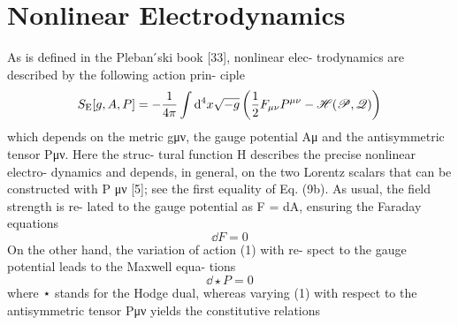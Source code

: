 \section{Nonlinear Electrodynamics}
As is defined in the Pleban ́ski book [33], nonlinear elec- trodynamics are described by the following action prin- ciple
\begin{equation}
  S_{\rm E}[g,A,P]=-\frac{1}{4\pi }\int\dd^4 x\sqrt{-g}\left(\frac{1}{2}F_{\mu\nu }P^{\mu\nu }-\mathscr{H}(\mathscr{P},\mathscr{Q})\right)
\end{equation}
which depends on the metric gμν, the gauge potential Aμ and the antisymmetric tensor Pμν. Here the struc- tural function H describes the precise nonlinear electro- dynamics and depends, in general, on the two Lorentz scalars that can be constructed with P μν [5]; see the first equality of Eq. (9b). As usual, the field strength is re- lated to the gauge potential as F = dA, ensuring the Faraday equations
\begin{equation}
  \dd F=0
\end{equation}
On the other hand, the variation of action (1) with re- spect to the gauge potential leads to the Maxwell equa- tions
\begin{equation}
	\dd \star P=0
\end{equation}
where ⋆ stands for the Hodge dual, whereas varying (1) with respect to the antisymmetric tensor Pμν yields the constitutive relations




